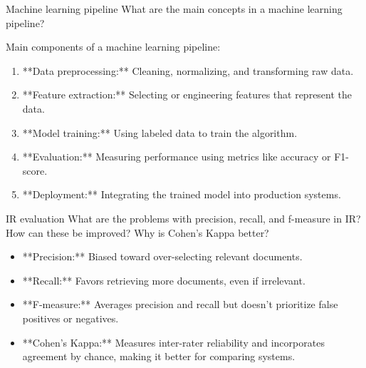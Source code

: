 \documentclass{article}
\begin{document}
\begin{exercise}{Machine learning pipeline}
  What are the main concepts in a machine learning pipeline?

  \begin{solution}
    Main components of a machine learning pipeline:
    \begin{enumerate}
        \item **Data preprocessing:** Cleaning, normalizing, and transforming raw data.
        \item **Feature extraction:** Selecting or engineering features that represent the data.
        \item **Model training:** Using labeled data to train the algorithm.
        \item **Evaluation:** Measuring performance using metrics like accuracy or F1-score.
        \item **Deployment:** Integrating the trained model into production systems.
    \end{enumerate}
  \end{solution}
\end{exercise}

\begin{exercise}{IR evaluation}
  What are the problems with precision, recall, and f-measure in IR? How can these be improved? Why is Cohen's Kappa better?

  \begin{solution}
    \begin{itemize}
        \item **Precision:** Biased toward over-selecting relevant documents.
        \item **Recall:** Favors retrieving more documents, even if irrelevant.
        \item **F-measure:** Averages precision and recall but doesn’t prioritize false positives or negatives.
        \item **Cohen's Kappa:** Measures inter-rater reliability and incorporates agreement by chance, making it better for comparing systems.
    \end{itemize}
  \end{solution}
\end{exercise}
\end{document}
